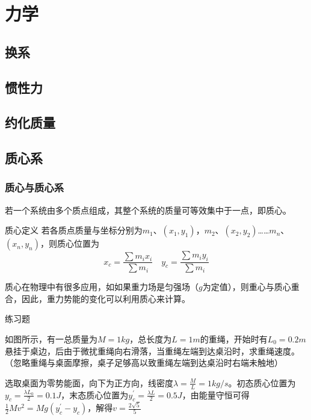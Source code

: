 
\chapter{力学}

\label{s_hx}
\section{换系}

\section{惯性力}

\label{s_yhzl}
\section{约化质量}

\section{质心系}

\subsection{质心与质心系}

若一个系统由多个质点组成，其整个系统的质量可等效集中于一点，即质心。

\label{zxdy}
\begin{theo}{质心定义}{}
若各质点质量与坐标分别为$m_1$、$(x_1,y_1)$，$m_2$、$(x_2,y_2)$……$m_n$、$(x_n,y_n)$，则质心位置为
$$x_c = \frac{\sum m_i x_i}{\sum m_i} \quad y_c = \frac{\sum m_i y_i}{\sum m_i}$$
\end{theo}

质心在物理中有很多应用，如如果重力场是匀强场（$g$为定值），则重心与质心重合，因此，重力势能的变化可以利用质心来计算。

\begin{ep}{练习题}{}

如图所示，有一总质量为$M=1kg$，总长度为$L=1m$的重绳，开始时有$L_0 = 0.2m$悬挂于桌边，后由于微扰重绳向右滑落，当重绳左端到达桌沿时，求重绳速度。（忽略重绳与桌面摩擦，桌子足够高以致重绳左端到达桌沿时右端未触地）
~\\

\begin{minipage}[b]{0.65\linewidth}
选取桌面为零势能面，向下为正方向，线密度$\lambda = \frac{M}{L} = 1kg/s$。初态质心位置为$y_c = \frac{\lambda L_0}{2} = 0.1J$，末态质心位置为$y_c^{\prime} = \frac{\lambda L}{2} = 0.5J$，由能量守恒可得$\frac{1}{2} M v^2 = Mg(y_c^{\prime}-y_c)$，解得$v = \frac{2\sqrt{5}}{5}$
\end{minipage}
\hfill
\begin{minipage}[b]{0.35\linewidth}

\end{minipage}
\end{ep}

